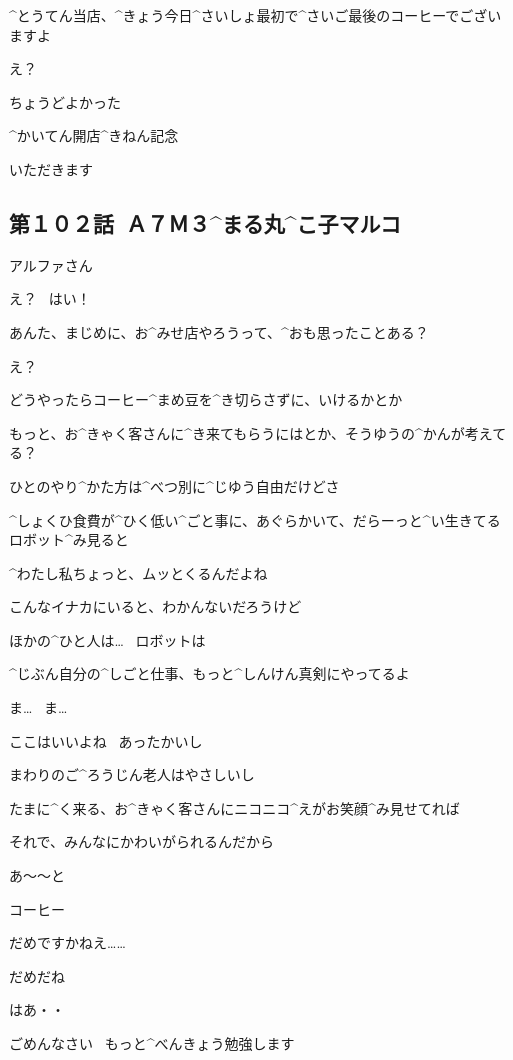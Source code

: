 \A ^{とうてん}{当店}、^{きょう}{今日}^{さいしょ}{最初}で^{さいご}{最後}のコーヒーでございますよ

\K え？

\A ちょうどよかった

\A ^{かいてん}{開店}^{きねん}{記念}

\K いただきます


\subsection{第１０２話\ Ａ７Ｍ３^{まる}{丸}^{こ}{子}マルコ}

\page[27]
\R アルファさん

\A え？
\ はい！

\page
\R あんた、まじめに、お^{みせ}{店}やろうって、^{おも}{思}ったことある？

\A え？

\R どうやったらコーヒー^{まめ}{豆}を^{き}{切}らさずに、いけるかとか

\R もっと、お^{きゃく}{客}さんに^{き}{来}てもらうにはとか、そうゆうの^{かんが}{考}えてる？

\page
\R ひとのやり^{かた}{方}は^{べつ}{別}に^{じゆう}{自由}だけどさ

\R ^{しょくひ}{食費}が^{ひく}{低}い^{ごと}{事}に、あぐらかいて、だらーっと^{い}{生}きてるロボット^{み}{見}ると

\R ^{わたし}{私}ちょっと、ムッとくるんだよね

\R こんなイナカにいると、わかんないだろうけど

\R ほかの^{ひと}{人}は…
\ ロボットは

\R ^{じぶん}{自分}の^{しごと}{仕事}、もっと^{しんけん}{真剣}にやってるよ

\K ま…
\ ま…

\page
\R ここはいいよね
\ あったかいし

\R まわりのご^{ろうじん}{老人}はやさしいし

\R たまに^{く}{来}る、お^{きゃく}{客}さんにニコニコ^{えがお}{笑顔}^{み}{見}せてれば

\R それで、みんなにかわいがられるんだから

\page
\A あ〜〜と

\A コーヒー

\A だめですかねえ……

\R だめだね

\A はあ・・

\page
\A ごめんなさい
\ もっと^{べんきょう}{勉強}します

